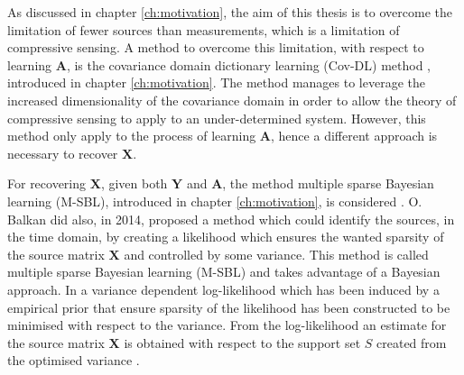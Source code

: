 As discussed in chapter \ref{ch:motivation}, the aim of this thesis is to overcome the limitation of fewer sources than measurements, which is a limitation of compressive sensing. 
A method to overcome this limitation, with respect to learning $\mathbf{A}$, is the covariance domain dictionary learning (Cov-DL) method \cite{Balkan2015}, introduced in chapter \ref{ch:motivation}. 
The method manages to leverage the increased dimensionality of the covariance domain in order to allow the theory of compressive sensing to apply to an under-determined system. 
However, this method only apply to the process of learning $\mathbf{A}$, hence a different approach is necessary to recover $\mathbf{X}$.

For recovering $\mathbf{X}$, given both $\mathbf{Y}$ and $\mathbf{A}$, the method multiple sparse Bayesian learning (M-SBL), introduced in chapter \ref{ch:motivation}, is considered .
O. Balkan \cite{Balkan2014} did also, in 2014, proposed a method which could identify the sources, in the time domain, by creating a likelihood which ensures the wanted sparsity of the source matrix $\mathbf{X}$ and controlled by some variance. This method is called multiple sparse Bayesian learning (M-SBL) and takes advantage of a Bayesian approach. 
In \cite{Balkan2014} a variance dependent log-likelihood which has been induced by a empirical prior that ensure sparsity of the likelihood has been constructed to be minimised with respect to the variance. 
From the log-likelihood an estimate for the source matrix $\mathbf{X}$ is obtained with respect to the support set $S$ created from the optimised variance .






